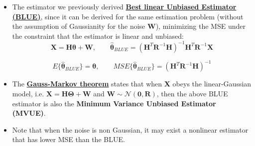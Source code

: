 \begin{itemize}
\item The estimator we previously derived \underline{\textbf{Best linear Unbiased Estimator (BLUE)}}, since it can be derived for the same estimation problem (without the assumption of Gaussianity for the noise \textbf{W}), minimizing the MSE under the constraint that the estimator is linear and unbiased:
\[
\mathbf{X} = \mathbf{H}\boldsymbol{\theta} + \mathbf{W},
\qquad
\hat{\boldsymbol{\theta}}_{BLUE}
= (\mathbf{H}^{T}\mathbf{R}^{-1}\mathbf{H})^{-1}
  \mathbf{H}^{T}\mathbf{R}^{-1}\mathbf{X}
\]

\[
E\{\hat{\boldsymbol{\theta}}_{BLUE}\}
= \boldsymbol{\theta},
\qquad
MSE\{\hat{\boldsymbol{\theta}}_{BLUE}\}
= (\mathbf{H}^{T}\mathbf{R}^{-1}\mathbf{H})^{-1}
\]

\item The \underline{\textbf{Gauss-Markov theorem}} states that when \textbf{X} obeys the linear-Gaussian model, i.e. \(\mathbf{X=H\Theta+W}\) and \(\mathbf{W\sim\mathcal{N}(0,R)}\), then the above BLUE estimator is also the \textbf{Minimum Variance Unbiased Estimator (MVUE)}.
\item Note that when the noise is non Gaussian, it may exist a nonlinear estimator that has lower MSE than the BLUE.
\end{itemize}
